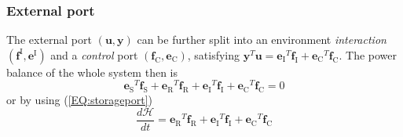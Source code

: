 \documentclass[a4paper,twoside, openright,12pt]{report}
\newcommand{\f}[1]{\boldsymbol{#1}}
\newcommand{\g}[1]{\text{#1}}
\begin{document}
\subsubsection{External port}
The external port $(\f{u},\f{y})$ can be further split into an environment \emph{interaction} $(\f{f}^\text{I},\f{e}^\text{I})$ and a \emph{control} port $(\f{f}_\g{C},\f{e}_\g{C})$, satisfying $\f{y}^T \f{u} = {\f{e}_\g{I}}^T \f{f}_\g{I} + {\f{e}_\g{C}}^T \f{f}_\g{C}$.
The power balance of the whole system then is
\begin{equation}
{\f{e}_\g{S}}^T \f{f}_\g{S} + {\f{e}_\g{R}}^T \f{f}_\g{R} +{\f{e}_\g{I}}^T \f{f}_\g{I} + {\f{e}_\g{C}}^T \f{f}_\g{C} = 0
\end{equation} 
or by using (\ref{EQ:storageport})
\begin{equation}\label{EQ:energybalance}
\frac{d\mathcal{H}}{dt} = {\f{e}_\g{R}}^T \f{f}_\g{R} + {\f{e}_\g{I}}^T\f{f}_\g{I} + {\f{e}_\g{C}}^T \f{f}_\g{C} 
\end{equation}
\end{document}

